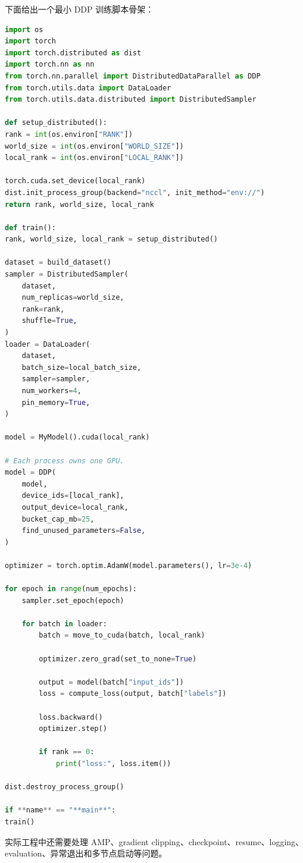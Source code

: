 下面给出一个最小 DDP 训练脚本骨架：

\begin{lstlisting}[language=Python,caption={PyTorch DDP 训练循环骨架},label={lst:pytorch-ddp-training-loop}]
import os
import torch
import torch.distributed as dist
import torch.nn as nn
from torch.nn.parallel import DistributedDataParallel as DDP
from torch.utils.data import DataLoader
from torch.utils.data.distributed import DistributedSampler

def setup_distributed():
rank = int(os.environ["RANK"])
world_size = int(os.environ["WORLD_SIZE"])
local_rank = int(os.environ["LOCAL_RANK"])

torch.cuda.set_device(local_rank)
dist.init_process_group(backend="nccl", init_method="env://")
return rank, world_size, local_rank

def train():
rank, world_size, local_rank = setup_distributed()

dataset = build_dataset()
sampler = DistributedSampler(
    dataset,
    num_replicas=world_size,
    rank=rank,
    shuffle=True,
)
loader = DataLoader(
    dataset,
    batch_size=local_batch_size,
    sampler=sampler,
    num_workers=4,
    pin_memory=True,
)

model = MyModel().cuda(local_rank)

# Each process owns one GPU.
model = DDP(
    model,
    device_ids=[local_rank],
    output_device=local_rank,
    bucket_cap_mb=25,
    find_unused_parameters=False,
)

optimizer = torch.optim.AdamW(model.parameters(), lr=3e-4)

for epoch in range(num_epochs):
    sampler.set_epoch(epoch)

    for batch in loader:
        batch = move_to_cuda(batch, local_rank)

        optimizer.zero_grad(set_to_none=True)

        output = model(batch["input_ids"])
        loss = compute_loss(output, batch["labels"])

        loss.backward()
        optimizer.step()

        if rank == 0:
            print("loss:", loss.item())

dist.destroy_process_group()

if **name** == "**main**":
train()
\end{lstlisting}

实际工程中还需要处理 AMP、gradient clipping、checkpoint、resume、logging、evaluation、异常退出和多节点启动等问题。

